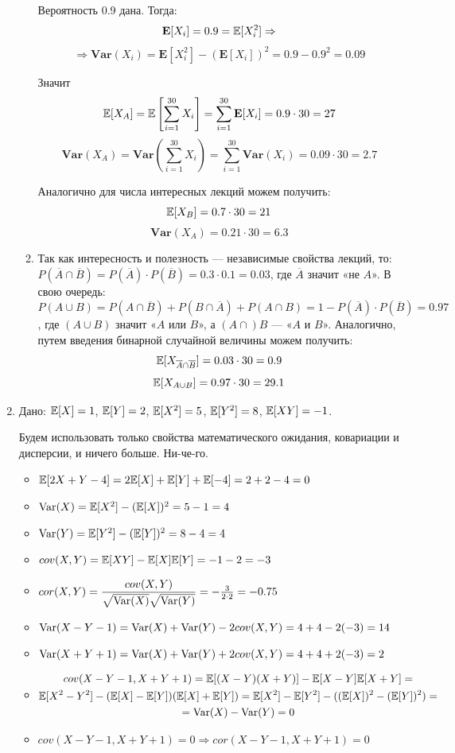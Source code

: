 \documentclass[12pt, a4paper]{article}\usepackage[]{graphicx}\usepackage[]{color}
\begin{document}
\begin{enumerate}
\begin{enumerate}
Вероятность 0.9 дана. Тогда:
\[
\mathbf{E}[X_i] = 0.9 = \mathbb{E}[X^2_i] \Rightarrow
\]
\[
\Rightarrow \mathbf{Var}(X_i) = \mathbf{E}[X^2_i] - (\mathbf{E}[X_i])^2 = 0.9 - 0.9^2 = 0.09
\]

Значит
\[
\mathbb{E}[X_A] = \mathbb{E}\left[\sum\limits_{i=1}^{30}X_i\right] = \sum\limits_{i=1}^{30}\mathbf{E}[X_i]  = 0.9\cdot30 = 27
\]
\[
\mathbf{Var}(X_A) = \mathbf{Var}\left(\sum\limits_{i=1}^{30}X_i\right) = \sum\limits_{i=1}^{30}\mathbf{Var}(X_i) = 0.09\cdot30 = 2.7
\]

Аналогично для числа интересных лекций можем получить:
\[
\mathbb{E}[X_B] = 0.7\cdot 30 = 21
\]
\[
\mathbf{Var}(X_A) = 0.21\cdot 30 = 6.3
\]


\item Так как интересность и полезность — независимые свойства лекций, то:\\
 $P(\overline{A} \cap \overline{B}) = P(\overline{A})\cdot P(\overline{B}) = 0.3\cdot0.1 = 0.03$, где $\overline{A}$ значит «не $A$». В свою очередь:\\
 $P(A\cup B) = P(A\cap\overline{B}) + P(B\cap\overline{A}) + P(A\cap B) = 1 - P(\overline{A})\cdot P(\overline{B}) = 0.97$ , где $(A\cup B)$ значит «$A$ или $B$», а $(A\cap)B$ — «$A$ и $B$». Аналогично, путем введения бинарной случайной величины можем получить:
 \[
 \mathbb{E}[X_{\overline{A} \cap \overline{B}}] = 0.03 \cdot  30 = 0.9
 \]
 \[
 \mathbb{E}[X_{A\cup B}] = 0.97\cdot30 = 29.1
\]

\end{enumerate}

\item
Дано: $\mathbb{E}[X] = 1$, $\mathbb{E}[Y] = 2$, $\mathbb{E}[X^2] = 5$, $\mathbb{E}[Y^2] = 8$, $\mathbb{E}[XY] = -1$.

Будем использовать только свойства математического ожидания, ковариации и дисперсии, и ничего больше. Ни-че-го.

\begin{itemize}
\item  $\mathbb{E}[2X + Y - 4] = 2\mathbb{E}[X] + \mathbb{E}[Y] + \mathbb{E}[-4] = 2 + 2 - 4 = 0 $
\item $\operatorname{Var}(X) = \mathbb{E}[X^2] - (\mathbb{E}[X])^2 = 5 - 1 = 4 $
\item $\operatorname{Var}(Y) = \mathbb{E}[Y^2] - (\mathbb{E}[Y])^2 = 8 - 4 = 4 $
\item $cov(X, Y) = \mathbb{E}[XY] - \mathbb{E}[X]\mathbb{E}[Y] = -1 - 2 = -3$
\item $cor(X, Y) = \dfrac{cov(X, Y)}{\sqrt{\operatorname{Var}(X)}\sqrt{\operatorname{Var}(Y)}} = -\frac{3}{2\cdot 2} = -0.75$
\item $\operatorname{Var}(X-Y-1) = \operatorname{Var}(X) + \operatorname{Var}(Y) - 2cov(X, Y) = 4+4 -2(-3) = 14$
\item $\operatorname{Var}(X+Y+1) = \operatorname{Var}(X) + \operatorname{Var}(Y) + 2cov(X, Y) = 4+4+2(-3) =2 $
\item \begin{multline}
cov(X-Y-1, X+Y+1)=\mathbb{E}[(X-Y)(X+Y)]-\mathbb{E}[X-Y]\mathbb{E}[X+Y] = \\
\mathbb{E}[X^2-Y^2] - (\mathbb{E}[X]-\mathbb{E}[Y])(\mathbb{E}[X] + \mathbb{E}[Y]) =
\mathbb{E}[X^2] - \mathbb{E}[Y^2] - ((\mathbb{E}[X])^2 -(\mathbb{E}[Y])^2)=\\
 = \operatorname{Var}(X)-\operatorname{Var}(Y) = 0
 \end{multline}
 \item $cov(X-Y-1, X+Y+1)=0 \Rightarrow cor(X-Y-1, X+Y+1) = 0 $
\end{itemize}


\end{enumerate}
\end{document}
